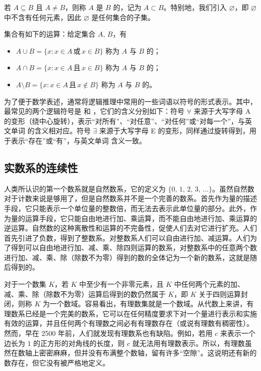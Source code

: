 \documentclass[UTF8,12pt,a4paper,fontset=fandol]{ctexbook}
\begin{document}
若 $A\subseteq B$ 且 $A\ne B$，则称 $A$ 是 $B$ 的，记为 $A\subset B$。特别地，我们引入 $\varnothing$，即 $\varnothing$ 中不含有任何元素，因此 $\varnothing$ 是任何集合的子集。


集合有如下的运算：给定集合 $A,\, B$，有
\begin{itemize}
  \item $A\cup B=\{x:x\in A \,\text{或}\, x\in B\}$ 称为 $A$ 与 $B$ 的；
  \item $A\cap B=\{x:x\in A\,\text{且}\,x\in B\}$ 称为 $A$ 与 $B$ 的；
  \item $A\setminus B=\{x:x\in A\,\text{且}\,x\notin B\}$ 称为 $A$ 与 $B$ 的。
\end{itemize}


为了便于数学表述，通常将逻辑推理中常用的一些词语以符号的形式表示。其中，最常见的两个逻辑符号是 \impo{$\forall$} 和 \impo{$\exists$}，它们的含义分别如下：符号 $\forall$ 来源于大写字母 A 的变形（绕中心旋转），表示“对所有”、“对任意”、“对任何”或“对每一个”，与英文单词  的含义相对应。符号 $\exists$ 来源于大写字母 E 的变形，同样通过旋转得到，用于表示“存在”或“有”，与英文单词  含义一致。


\subsection{实数系的连续性}
人类所认识的第一个数系就是自然数系，它的定义为 $\{0,\,1,\,2,\,3,\,\dots\}$。虽然自然数对于计数来说是够用了，但是自然数系并不是一个完善的数系。首先作为量的描述手段，它只能表示一个单位量的整数倍，而无法去表示此单位量的部分。此外，作为量的运算手段，它只能自由地进行加、乘运算，而不能自由地进行加、乘运算的逆运算。自然数的这种离散性和运算的不完备性，促使人们去对它进行扩充。人们首先引进了负数，得到了整数系。对整数系人们可以自由进行加、减运算。人们为了得到可以自由地进行加、减、乘、除四则运算的数系，对整数系中的任意两个数进行加、减、乘、除（除数不为零）得到的数的全体记为一个新的数系，这就是随后得到的。


对于一个数集 $K$，若 $K$ 中至少有一个非零元素，且 $K$ 中任何两个元素的加、减、乘、除（除数不为零）运算后得到的数仍然属于 $K$，即 $K$ 关于四则运算封闭，则称 $K$ 为一个数域。容易看出，有理数集就是一个数域。从代数上来讲，有理数系已经是一个完美的数系，它可以在任何精度要求下对一个量进行表示和实施有效的运算，并且任何两个有理数之间必有有理数存在（或说有理数有稠密性）。然而，早在 2500 年前，人们就发现有理数系也有缺陷。例如，若用 $c$ 来表示一个边长为 $1$ 的正方形的对角线的长度，则 $c$ 就无法用有理数表示。所以，有理数虽然在数轴上密密麻麻，但并没有布满整个数轴，留有许多“空隙”。这说明还有新的数存在，但它没有被严格地定义。
\end{document}
